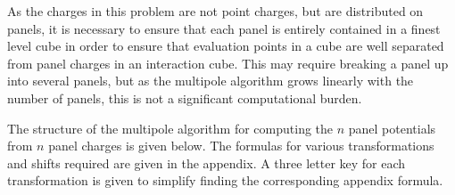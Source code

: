 \begin{Remarknonum}
As the charges in this problem are not point charges, but are
distributed on panels, it
is necessary to ensure that each panel is entirely contained in a finest
level cube  in order to ensure that evaluation points in a
cube are well separated from panel charges in an interaction cube.  
This may require breaking a panel up into several panels,
but as the multipole algorithm grows linearly with the number of
panels, this is not a significant computational burden.
\end{Remarknonum}

The structure of the multipole algorithm for computing the $ n $ panel 
potentials from $ n $ panel charges is given below.  The formulas for
various transformations and shifts required are given in the appendix.
A three letter key for each transformation is given to simplify finding
the corresponding  appendix formula.

